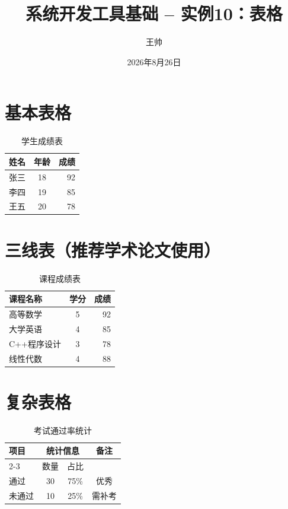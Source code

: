 \documentclass[12pt,a4paper]{article}
\title{系统开发工具基础 -- 实例10：表格}
\author{王帅}
\date{2026年8月26日}
\begin{document}
\maketitle

\section{基本表格}
\begin{table}[h]
\centering
\begin{tabular}{|l|c|r|}
\hline
姓名 & 年龄 & 成绩 \\
\hline
张三 & 18 & 92 \\
李四 & 19 & 85 \\
王五 & 20 & 78 \\
\hline
\end{tabular}
\caption{学生成绩表}
\end{table}

\section{三线表（推荐学术论文使用）}
\begin{table}[h]
\centering
\begin{tabular}{lcr}
\toprule
课程名称 & 学分 & 成绩 \\
\midrule
高等数学 & 5 & 92 \\
大学英语 & 4 & 85 \\
C++程序设计 & 3 & 78 \\
线性代数 & 4 & 88 \\
\bottomrule
\end{tabular}
\caption{课程成绩表}
\end{table}

\section{复杂表格}
\begin{table}[h]
\centering
\begin{tabular}{|l|c|c|c|}
\hline
\textbf{项目} & \multicolumn{2}{c|}{\textbf{统计信息}} & \textbf{备注} \\
\cline{2-3}
 & 数量 & 占比 & \\
\hline
通过 & 30 & 75\% & 优秀 \\
未通过 & 10 & 25\% & 需补考 \\
\hline
\end{tabular}
\caption{考试通过率统计}
\end{table}
\end{document}
